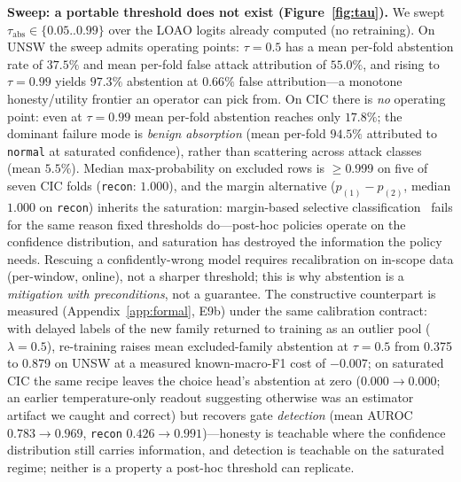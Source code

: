 \documentclass[sigconf,anonymous=false]{acmart}
\begin{document}
\textbf{Sweep: a portable threshold does not exist (Figure~\ref{fig:tau}).} We swept $\tau_{\mathrm{abs}}\in\{0.05..0.99\}$ over the LOAO logits already computed (no retraining). On UNSW the sweep admits operating points: $\tau{=}0.5$ has a mean per-fold abstention rate of $37.5\%$ and mean per-fold false attack attribution of $55.0\%$, and rising to $\tau{=}0.99$ yields $97.3\%$ abstention at $0.66\%$ false attribution---a monotone honesty/utility frontier an operator can pick from. On CIC there is \emph{no} operating point: even at $\tau{=}0.99$ mean per-fold abstention reaches only $17.8\%$; the dominant failure mode is \emph{benign absorption} (mean per-fold $94.5\%$ attributed to \texttt{normal} at saturated confidence), rather than scattering across attack classes (mean $5.5\%$). Median max-probability on excluded rows is $\ge$0.999 on five of seven CIC folds (\texttt{recon}: $1.000$), and the margin alternative ($p_{(1)}-p_{(2)}$, median $1.000$ on \texttt{recon}) inherits the saturation: margin-based selective classification~\cite{geifman2017} fails for the same reason fixed thresholds do---post-hoc policies operate on the confidence distribution, and saturation has destroyed the information the policy needs. Rescuing a confidently-wrong model requires recalibration on in-scope data (per-window, online), not a sharper threshold; this is why abstention is a \emph{mitigation with preconditions}, not a guarantee. The constructive counterpart is measured (Appendix~\ref{app:formal}, E9b) under the same calibration contract: with delayed labels of the new family returned to training as an outlier pool ($\lambda{=}0.5$), re-training raises mean excluded-family abstention at $\tau{=}0.5$ from 0.375 to 0.879 on UNSW at a measured known-macro-F1 cost of $-0.007$; on saturated CIC the same recipe leaves the choice head's abstention at zero ($0.000\to0.000$; an earlier temperature-only readout suggesting otherwise was an estimator artifact we caught and correct) but recovers gate \emph{detection} (mean AUROC $0.783\to0.969$, \texttt{recon} $0.426\to0.991$)---honesty is teachable where the confidence distribution still carries information, and detection is teachable on the saturated regime; neither is a property a post-hoc threshold can replicate.
\end{document}
